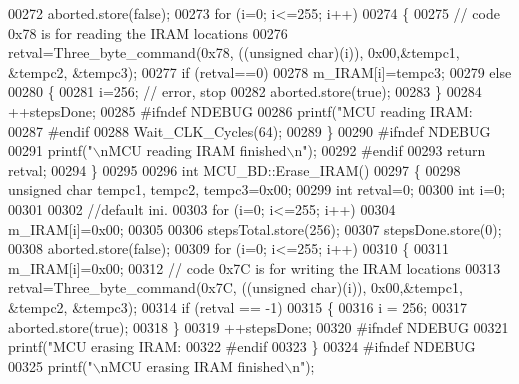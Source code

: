 \begin{DoxyCode}
00272     aborted.store(\textcolor{keyword}{false});
00273     \textcolor{keywordflow}{for} (i=0; i<=255; i++)
00274     \{
00275         \textcolor{comment}{// code 0x78 is for reading the IRAM locations}
00276         retval=Three\_byte\_command(0x78, ((\textcolor{keywordtype}{unsigned} \textcolor{keywordtype}{char})(i)), 0x00,&tempc1, &tempc2, &tempc3);
00277         \textcolor{keywordflow}{if} (retval==0)
00278             m\_IRAM[i]=tempc3;
00279         \textcolor{keywordflow}{else}
00280         \{
00281             i=256; \textcolor{comment}{// error, stop}
00282             aborted.store(\textcolor{keyword}{true});
00283         \}
00284         ++stepsDone;
00285 \textcolor{preprocessor}{#ifndef NDEBUG}
00286         printf(\textcolor{stringliteral}{"MCU reading IRAM: %
00287 \textcolor{preprocessor}{#endif}
00288         Wait\_CLK\_Cycles(64);
00289     \}
00290 \textcolor{preprocessor}{#ifndef NDEBUG}
00291     printf(\textcolor{stringliteral}{"\(\backslash\)nMCU reading IRAM finished\(\backslash\)n"});
00292 \textcolor{preprocessor}{#endif}
00293     \textcolor{keywordflow}{return} retval;
00294 \}
00295 
00296 \textcolor{keywordtype}{int} MCU\_BD::Erase\_IRAM()
00297 \{
00298     \textcolor{keywordtype}{unsigned} \textcolor{keywordtype}{char} tempc1, tempc2, tempc3=0x00;
00299     \textcolor{keywordtype}{int} retval=0;
00300     \textcolor{keywordtype}{int} i=0;
00301 
00302     \textcolor{comment}{//default ini.}
00303     \textcolor{keywordflow}{for} (i=0; i<=255; i++)
00304             m\_IRAM[i]=0x00;
00305 
00306     stepsTotal.store(256);
00307     stepsDone.store(0);
00308     aborted.store(\textcolor{keyword}{false});
00309     \textcolor{keywordflow}{for} (i=0; i<=255; i++)
00310     \{
00311             m\_IRAM[i]=0x00;
00312             \textcolor{comment}{// code 0x7C is for writing the IRAM locations}
00313             retval=Three\_byte\_command(0x7C, ((\textcolor{keywordtype}{unsigned} \textcolor{keywordtype}{char})(i)), 0x00,&tempc1, &tempc2, &tempc3);
00314             \textcolor{keywordflow}{if} (retval == -1)
00315             \{
00316                 i = 256;
00317                 aborted.store(\textcolor{keyword}{true});
00318             \}
00319             ++stepsDone;
00320 \textcolor{preprocessor}{#ifndef NDEBUG}
00321             printf(\textcolor{stringliteral}{"MCU erasing IRAM: %
00322 \textcolor{preprocessor}{#endif}
00323     \}
00324 \textcolor{preprocessor}{#ifndef NDEBUG}
00325     printf(\textcolor{stringliteral}{"\(\backslash\)nMCU erasing IRAM finished\(\backslash\)n"});
}}
\end{DoxyCode}
